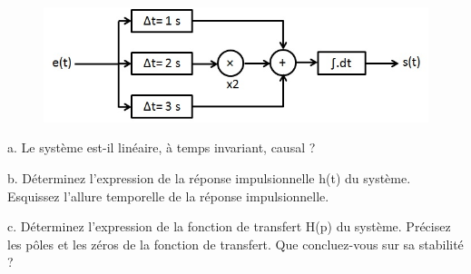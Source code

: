 	\begin{figure}[h!]
		\centering
		\includegraphics[scale=0.5]{images/Exo_2_6.jpg} 
	\end{figure}
	
	a. Le système est-il linéaire, à temps invariant, causal ?
	
	b. Déterminez l'expression de la réponse impulsionnelle h(t) du système. Esquissez l'allure temporelle de la réponse impulsionnelle. 
	
	c. Déterminez l'expression de la fonction de transfert H(p) du système. Précisez les pôles et les zéros de la fonction de transfert. Que concluez-vous sur sa stabilité ?
	




	